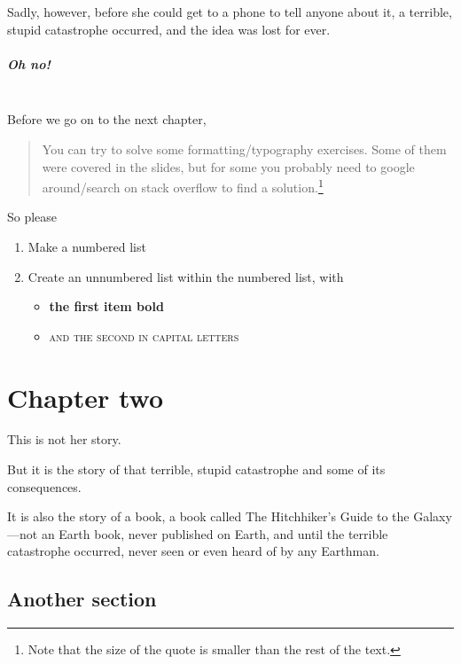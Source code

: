 \documentclass[a4paper, twocolumn, openany]{book}
\begin{document}
	Sadly, however, before she could get to a phone to tell anyone about it, a terrible, stupid catastrophe occurred, and the idea was lost for ever.
	
	\paragraph{Oh no!}~\\

\noindent Before we go on to the next chapter,
	
	\begin{quote}
		\small You can try to solve some formatting/typography exercises. Some of them were covered in the slides, but for some you probably need to google around/search on stack overflow to find a solution.\footnote{Note that the size of the quote is smaller than the rest of the text.}
	\end{quote}
	
\noindent So please
	
	\begin{enumerate}
		\item Make a numbered list
		\item Create an unnumbered list within the numbered list, with
		\begin{itemize}
			\item \textbf{the first item bold}
			\item \textsc{and the second in capital letters}
		\end{itemize}
	\end{enumerate}
	
	\chapter{Chapter two}
	
	\noindent This is not her story.
	
	But it is the story of that terrible, stupid catastrophe and some of its consequences.
	
	It is also the story of a book, a book called The Hitchhiker’s Guide to the Galaxy—not an Earth book, never published on Earth, and until the terrible catastrophe occurred, never seen or even heard of by any Earthman.
	
	\section{Another section}
	
\end{document}
